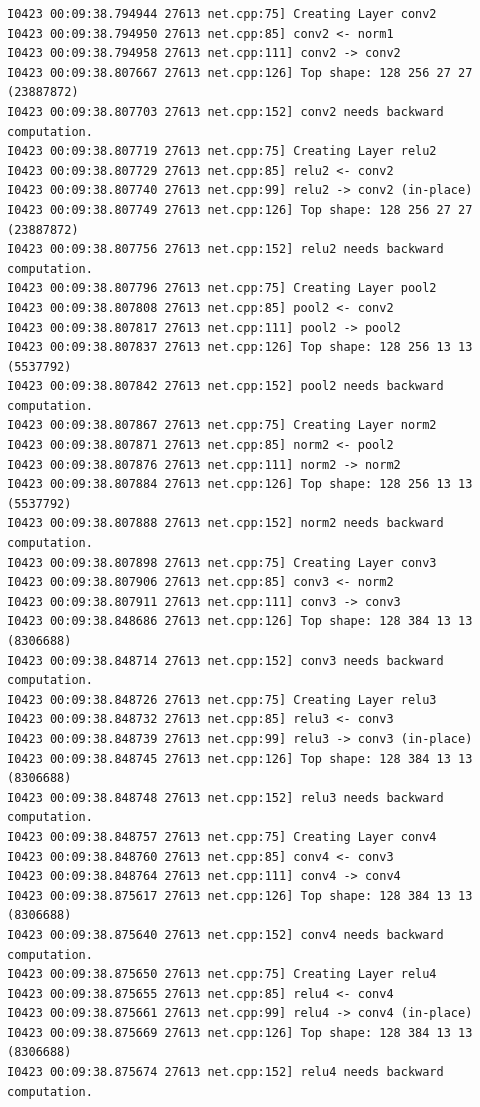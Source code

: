 \documentclass[a4]{article}
\begin{document}
\begin{lstlisting}
I0423 00:09:38.794944 27613 net.cpp:75] Creating Layer conv2
I0423 00:09:38.794950 27613 net.cpp:85] conv2 <- norm1
I0423 00:09:38.794958 27613 net.cpp:111] conv2 -> conv2
I0423 00:09:38.807667 27613 net.cpp:126] Top shape: 128 256 27 27 (23887872)
I0423 00:09:38.807703 27613 net.cpp:152] conv2 needs backward computation.
I0423 00:09:38.807719 27613 net.cpp:75] Creating Layer relu2
I0423 00:09:38.807729 27613 net.cpp:85] relu2 <- conv2
I0423 00:09:38.807740 27613 net.cpp:99] relu2 -> conv2 (in-place)
I0423 00:09:38.807749 27613 net.cpp:126] Top shape: 128 256 27 27 (23887872)
I0423 00:09:38.807756 27613 net.cpp:152] relu2 needs backward computation.
I0423 00:09:38.807796 27613 net.cpp:75] Creating Layer pool2
I0423 00:09:38.807808 27613 net.cpp:85] pool2 <- conv2
I0423 00:09:38.807817 27613 net.cpp:111] pool2 -> pool2
I0423 00:09:38.807837 27613 net.cpp:126] Top shape: 128 256 13 13 (5537792)
I0423 00:09:38.807842 27613 net.cpp:152] pool2 needs backward computation.
I0423 00:09:38.807867 27613 net.cpp:75] Creating Layer norm2
I0423 00:09:38.807871 27613 net.cpp:85] norm2 <- pool2
I0423 00:09:38.807876 27613 net.cpp:111] norm2 -> norm2
I0423 00:09:38.807884 27613 net.cpp:126] Top shape: 128 256 13 13 (5537792)
I0423 00:09:38.807888 27613 net.cpp:152] norm2 needs backward computation.
I0423 00:09:38.807898 27613 net.cpp:75] Creating Layer conv3
I0423 00:09:38.807906 27613 net.cpp:85] conv3 <- norm2
I0423 00:09:38.807911 27613 net.cpp:111] conv3 -> conv3
I0423 00:09:38.848686 27613 net.cpp:126] Top shape: 128 384 13 13 (8306688)
I0423 00:09:38.848714 27613 net.cpp:152] conv3 needs backward computation.
I0423 00:09:38.848726 27613 net.cpp:75] Creating Layer relu3
I0423 00:09:38.848732 27613 net.cpp:85] relu3 <- conv3
I0423 00:09:38.848739 27613 net.cpp:99] relu3 -> conv3 (in-place)
I0423 00:09:38.848745 27613 net.cpp:126] Top shape: 128 384 13 13 (8306688)
I0423 00:09:38.848748 27613 net.cpp:152] relu3 needs backward computation.
I0423 00:09:38.848757 27613 net.cpp:75] Creating Layer conv4
I0423 00:09:38.848760 27613 net.cpp:85] conv4 <- conv3
I0423 00:09:38.848764 27613 net.cpp:111] conv4 -> conv4
I0423 00:09:38.875617 27613 net.cpp:126] Top shape: 128 384 13 13 (8306688)
I0423 00:09:38.875640 27613 net.cpp:152] conv4 needs backward computation.
I0423 00:09:38.875650 27613 net.cpp:75] Creating Layer relu4
I0423 00:09:38.875655 27613 net.cpp:85] relu4 <- conv4
I0423 00:09:38.875661 27613 net.cpp:99] relu4 -> conv4 (in-place)
I0423 00:09:38.875669 27613 net.cpp:126] Top shape: 128 384 13 13 (8306688)
I0423 00:09:38.875674 27613 net.cpp:152] relu4 needs backward computation.

\end{lstlisting}
\end{document}

